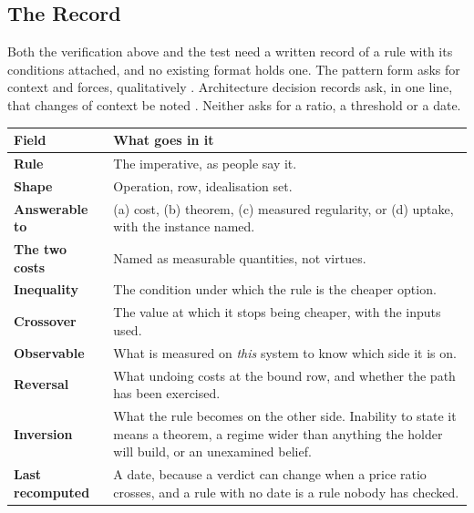 \documentclass[11pt,oneside]{article}
\theoremstyle{definition}
\theoremstyle{remark}
\begin{document}
\subsection{The Record}\label{sec:record}

Both the verification above and the test need a written record of a rule with its
conditions attached, and no existing format holds one. The pattern form asks for context
and forces, qualitatively \cite{alexander1977,gamma1994}. Architecture decision records ask,
in one line, that changes of context be noted \cite{nygard2011}. Neither asks for a ratio,
a threshold or a date.

\begin{center}
\small
\begin{longtable}{@{}p{}p{}@{}}
\toprule
\textbf{Field} & \textbf{What goes in it} \\
\midrule
\endhead
\textbf{Rule} & The imperative, as people say it. \\
\addlinespace
\textbf{Shape} & Operation, row, idealisation set. \\
\addlinespace
\textbf{Answerable to} & (a) cost, (b) theorem, (c) measured regularity, or (d) uptake,
with the instance named. \\
\addlinespace
\textbf{The two costs} & Named as measurable quantities, not virtues. \\
\addlinespace
\textbf{Inequality} & The condition under which the rule is the cheaper option. \\
\addlinespace
\textbf{Crossover} & The value at which it stops being cheaper, with the inputs used. \\
\addlinespace
\textbf{Observable} & What is measured on \emph{this} system to know which side it is on. \\
\addlinespace
\textbf{Reversal} & What undoing costs at the bound row, and whether the path has been
exercised. \\
\addlinespace
\textbf{Inversion} & What the rule becomes on the other side. Inability to state it means a
theorem, a regime wider than anything the holder will build, or an unexamined belief. \\
\addlinespace
\textbf{Last recomputed} & A date, because a verdict can change when a price ratio
crosses, and a rule with no date is a rule nobody has checked.
\\
\bottomrule
\end{longtable}
\end{center}
\end{document}
